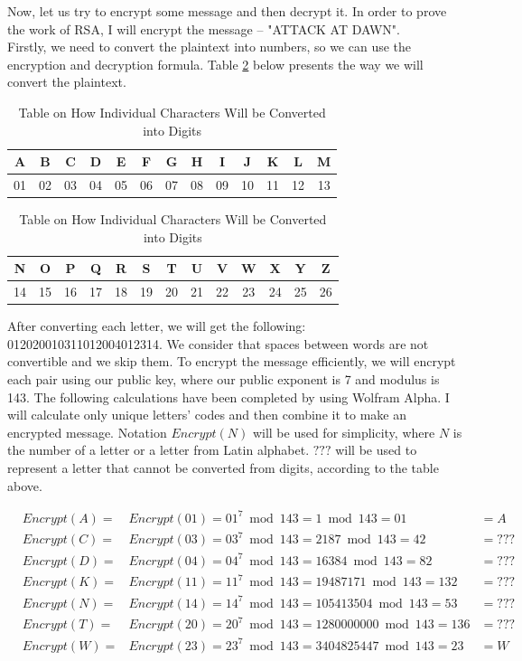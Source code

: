 \documentclass[a4paper, 12pt]{article}
\begin{document}
Now, let us try to encrypt some message and then decrypt it. In order to prove the work of RSA, I
will encrypt the message – "ATTACK AT DAWN".\\

Firstly, we need to convert the plaintext into numbers, so we can use the encryption and decryption
formula. Table \ref{table:simple} below presents the way we will convert the plaintext.

\begin{table}[t!]
  \begin{center}
    \begin{tabular}{c|c|c|c|c|c|c|c|c|c|c|c|c}
      A& B& C& D& E& F& G& H& I& J& K& L& M\\
      \hline
      01& 02& 03& 04& 05& 06& 07& 08& 09& 10& 11& 12& 13\\
    \end{tabular}
    \begin{tabular}{c|c|c|c|c|c|c|c|c|c|c|c|c}
      N& O& P& Q& R& S& T& U& V& W& X& Y& Z\\
      \hline
      14& 15& 16& 17& 18& 19& 20& 21& 22& 23& 24& 25& 26\\
    \end{tabular}
    \caption{Table on How Individual Characters Will be Converted into Digits}
    \label{table:simple}
  \end{center}
  \end{table}

After converting each letter, we will get the following: 012020010311012004012314. We
consider that spaces between words are not convertible and we skip them. To encrypt the message
efficiently, we will encrypt each pair using our public key, where our public exponent is 7 and
modulus is 143. The following calculations have been completed by using Wolfram Alpha. I will
calculate only unique letters’ codes and then combine it to make an encrypted message. Notation
$Encrypt(N)$ will be used for simplicity, where $N$ is the number of a letter or a letter from Latin alphabet.
$???$ will be used to represent a letter that cannot be converted from digits, according to the table above.

\begin{align*}
  &Encrypt(A)=&Encrypt(01)=01^7 \bmod 143=1 \bmod 143=01&=A\\
  &Encrypt(C)=&Encrypt(03)=03^7 \bmod 143=2187 \bmod 143=42&=???\\
  &Encrypt(D)=&Encrypt(04)=04^7 \bmod 143=16384 \bmod 143=82&=???\\
  &Encrypt(K)=&Encrypt(11)=11^7 \bmod 143=19487171 \bmod 143=132&=???\\
  &Encrypt(N)=&Encrypt(14)=14^7 \bmod 143=105413504 \bmod 143=53&=???\\
  &Encrypt(T)=&Encrypt(20)=20^7 \bmod 143=1280000000 \bmod 143=136&=???\\
  &Encrypt(W)=&Encrypt(23)=23^7 \bmod 143=3404825447 \bmod 143=23&=W\\
\end{align*}
\end{document}
